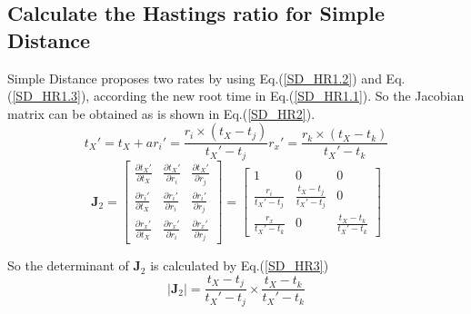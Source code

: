 \documentclass{bmcart}
\begin{document}
\begin{backmatter}
\subsection*{Calculate the Hastings ratio for Simple Distance}
Simple Distance proposes two rates by using Eq.(\ref{SD_HR1.2}) and Eq.(\ref{SD_HR1.3}), according the new root time in Eq.(\ref{SD_HR1.1}). So the Jacobian matrix can be obtained as is shown in Eq.(\ref{SD_HR2}).
\begin{subequations}\label{SD_HR1}
\begin{equation}\label{SD_HR1.1}
 {t_X}' = {t_X} + a
\end{equation}  
\begin{equation} \label{SD_HR1.2}
{r_i}' = \frac{{{r_i} \times ({t_X} - {t_j})}}{{{t_X}' - {t_j}}} 
\end{equation}  
\begin{equation}\label{SD_HR1.3}
  {r_x}' = \frac{{{r_k} \times ({t_X} - {t_k})}}{{{t_X}' - {t_k}}} 
\end{equation}  
\end{subequations}
\begin{equation}\label{SD_HR2}
{{\mathbf{J}}_2} = \left[ {\begin{array}{*{20}{c}}
  {\frac{{\partial {t_X}'}}{{\partial {t_X}}}}&{\frac{{\partial {t_X}'}}{{\partial {r_i}}}}&{\frac{{\partial {t_X}'}}{{\partial {r_j}}}} \\ 
  {\frac{{\partial {r_i}'}}{{\partial {t_X}}}}&{\frac{{\partial {r_i}'}}{{\partial {r_i}}}}&{\frac{{\partial {r_i}'}}{{\partial {r_j}}}} \\ 
  {\frac{{\partial {r_x}'}}{{\partial {t_X}}}}&{\frac{{\partial {r_x}'}}{{\partial {r_i}}}}&{\frac{{\partial {r_x}'}}{{\partial {r_j}}}} 
\end{array}} \right] = \left[ {\begin{array}{*{20}{c}}
  1&0&0 \\ 
  {\frac{{{r_i}}}{{{t_X}' - {t_j}}}}&{\frac{{{t_X} - {t_j}}}{{{t_X}' - {t_j}}}}&0 \\ 
  {\frac{{{r_x}}}{{{t_X}' - {t_k}}}}&0&{\frac{{{t_X} - {t_k}}}{{{t_X}' - {t_k}}}} 
\end{array}} \right]
\end{equation}

So the determinant of ${{\mathbf{J}}_2}$ is calculated by Eq.(\ref{SD_HR3})
\begin{equation}\label{SD_HR3}
\left| {{{\mathbf{J}}_2}} \right| = \frac{{{t_X} - {t_j}}}{{{t_X}' - {t_j}}} \times \frac{{{t_X} - {t_k}}}{{{t_X}' - {t_k}}}
\end{equation}

\end{backmatter}
\end{document}
